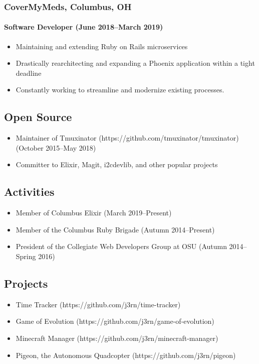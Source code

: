 \documentclass[]{article}
\begin{document}
\subsubsection*{CoverMyMeds, Columbus, OH}
\paragraph*{Software Developer (June 2018--March 2019)}
\begin{itemize}
\item Maintaining and extending Ruby on Rails microservices
\item Drastically rearchitecting and expanding a Phoenix application within a tight deadline
\item Constantly working to streamline and modernize existing processes.
\end{itemize}

\subsection*{Open Source}
\begin{itemize}
\item Maintainer of Tmuxinator (https://github.com/tmuxinator/tmuxinator) (October 2015--May 2018)
\item Committer to Elixir, Magit, i2cdevlib, and other popular projects
\end{itemize}

\subsection*{Activities}
\begin{itemize}
\item Member of Columbus Elixir (March 2019--Present)
\item Member of the Columbus Ruby Brigade (Autumn 2014--Present)
\item President of the Collegiate Web Developers Group at OSU (Autumn 2014--Spring 2016)
\end{itemize}

\subsection*{Projects}
\begin{itemize}
\item Time Tracker (https://github.com/j3rn/time-tracker)
\item Game of Evolution (https://github.com/j3rn/game-of-evolution)
\item Minecraft Manager (https://github.com/j3rn/minecraft-manager)
\item Pigeon, the Autonomous Quadcopter (https://github.com/j3rn/pigeon)
\end{itemize}
\end{document}
